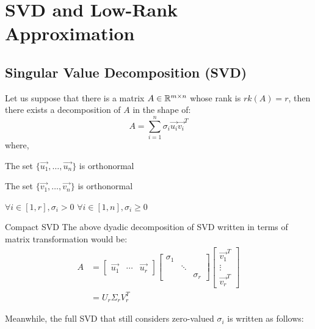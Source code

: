 \chapter{SVD and Low-Rank Approximation}

\section{Singular Value Decomposition (SVD)}
Let us suppose that there is a matrix $A \in \mathbb{R}^{m \times n}$ whose rank is $rk(A) = r$, then there exists a decomposition of $A$ in the shape of:
\[
    A = \sum_{i = 1}^n \sigma_i \vec{u_i} \vec{v_i}^T
\]
where,
\begin{bindenum}
    \item The set $\{\vec{u_1}, \dots, \vec{u_n}\}$ is orthonormal
    \item The set $\{\vec{v_1}, \dots, \vec{v_n}\}$ is orthonormal
    \item $\forall i \in [1, r], \sigma_i > 0$
    \subitem $\forall i \in [1, n], \sigma_i \geq 0$
\end{bindenum}
\begin{ln-symbol}{Compact SVD}{}
    The above dyadic decomposition of SVD written in terms of matrix transformation would be:
    \begin{align*}
        A &=
        \begin{bmatrix} \vec{u_1} & \cdots & \vec{u_r} \end{bmatrix}
        \begin{bmatrix}
            \sigma_1 & & \\
            & \ddots & \\
            & & \sigma_r
        \end{bmatrix}
        \begin{bmatrix} \vec{v_1}^T \\ \vdots \\ \vec{v_r}^T \end{bmatrix} \\
        &= U_r \Sigma_r V_r^T
    \end{align*}
\end{ln-symbol}
Meanwhile, the full SVD that still considers zero-valued $\sigma_i$ is written as follows:
